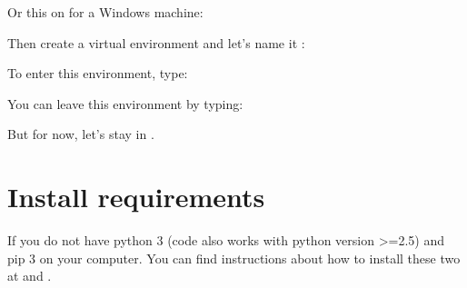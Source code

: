 \documentclass[letterpaper,10pt,english]{sphinxmanual}
\begin{document}
%
\begin{sphinxVerbatim}[commandchars=\\\{\}]
   
\end{sphinxVerbatim}

Or this on for a Windows machine:

%
\begin{sphinxVerbatim}[commandchars=\\\{\}]
   
\end{sphinxVerbatim}

Then create a virtual environment and let’s name it :

%
\begin{sphinxVerbatim}[commandchars=\\\{\}]
   
\end{sphinxVerbatim}

To enter this environment, type:

%
\begin{sphinxVerbatim}[commandchars=\\\{\}]
  
\end{sphinxVerbatim}

You can leave this environment by typing:

%
\begin{sphinxVerbatim}[commandchars=\\\{\}]
 
\end{sphinxVerbatim}

But for now, let’s stay in .


\section{Install requirements}
\label{\detokenize{getting_started:install-requirements}}\label{\detokenize{getting_started:requirements}}
If you do not have python 3 (code also works with python version \textgreater{}=2.5) and pip 3 on your computer.
You can find instructions about how to install these two at  and .
\end{document}
